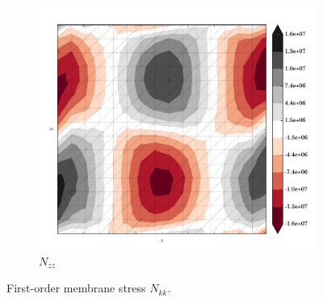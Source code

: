 \begin{figure}
  \begin{subfigure}[b]{0.3\linewidth}
    \includegraphics[width=\linewidth]{images/stress_balance/BP/N_zz.pdf}
  \caption{$N_{zz}$}
  \label{bp_N_zz}
  \end{subfigure}
 
  \caption[ISMIP-HOM first-order membrane stress]{First-order membrane stress $N_{kk}$.}

  \label{bp_membrane_stress}

\end{figure}


